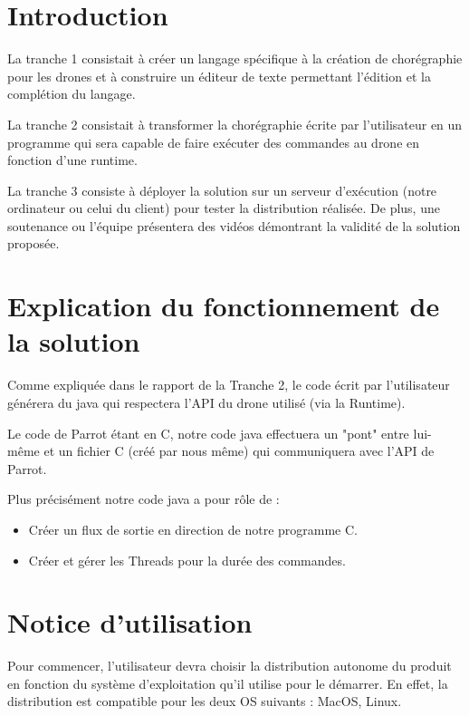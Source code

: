 \documentclass[12pt]{article}
\begin{document}
    \section{Introduction}
        La tranche 1 consistait à créer un langage spécifique à la création de chorégraphie pour les drones et à construire un éditeur de texte permettant l'édition et la complétion du langage.
        
        La tranche 2 consistait à transformer la chorégraphie écrite par l'utilisateur en un programme qui sera capable de faire exécuter des commandes au drone en fonction d'une runtime.
        
        La tranche 3 consiste à déployer la solution sur un serveur d'exécution (notre ordinateur ou celui du client) pour tester la distribution réalisée. De plus, une soutenance ou l'équipe présentera des vidéos démontrant la validité de la solution proposée.

    \section{Explication du fonctionnement de la solution}
        Comme expliquée dans le rapport de la Tranche 2, le code écrit par l'utilisateur générera du java qui respectera l'API du drone utilisé (via la Runtime).
        
        Le code de Parrot étant en C, notre code java effectuera un "pont" entre lui-même et un fichier C (créé par nous même) qui communiquera avec l'API de Parrot.
        
        Plus précisément notre code java a pour rôle de :
        
        \begin{itemize}
            \item Créer un flux de sortie en direction de notre programme C.
            \item Créer et gérer les Threads pour la durée des commandes.
        \end{itemize}
    
    \newpage
    \section{Notice d'utilisation}
        Pour commencer, l'utilisateur devra choisir la distribution autonome du produit en fonction du système d'exploitation qu'il utilise pour le démarrer.
        En effet, la distribution est compatible pour les deux OS suivants : MacOS, Linux.
        
\end{document}
